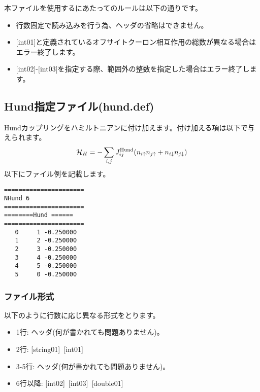 \subsubsection{}
本ファイルを使用するにあたってのルールは以下の通りです。
\begin{itemize}
\item 行数固定で読み込みを行う為、ヘッダの省略はできません。
\item $[$int01$]$と定義されているオフサイトクーロン相互作用の総数が異なる場合はエラー終了します。
\item $[$int02$]$-$[$int03$]$を指定する際、範囲外の整数を指定した場合はエラー終了します。
\end{itemize}

\newpage
\subsection{Hund指定ファイル(hund.def)}
Hundカップリングをハミルトニアンに付け加えます。付け加える項は以下で与えられます。
\begin{equation}
{\cal H}_H =-\sum_{i,j}J_{ij}^{\rm Hund} (n_{i\uparrow}n_{j\uparrow}+n_{i\downarrow}n_{j\downarrow})
\end{equation}
以下にファイル例を記載します。

\begin{minipage}{12.5cm}
\begin{screen}
\begin{verbatim}
====================== 
NHund 6  
====================== 
========Hund ====== 
====================== 
   0     1 -0.250000
   1     2 -0.250000
   2     3 -0.250000
   3     4 -0.250000
   4     5 -0.250000
   5     0 -0.250000
\end{verbatim}
\end{screen}
\end{minipage}

\subsubsection{ファイル形式}
以下のように行数に応じ異なる形式をとります。
 \begin{itemize}
   \item  1行:  ヘッダ(何が書かれても問題ありません)。
   \item  2行:   [string01]~[int01]
   \item  3-5行:  ヘッダ(何が書かれても問題ありません)。
   \item  6行以降:
   [int02]~[int03]~[double01] 
  \end{itemize}

